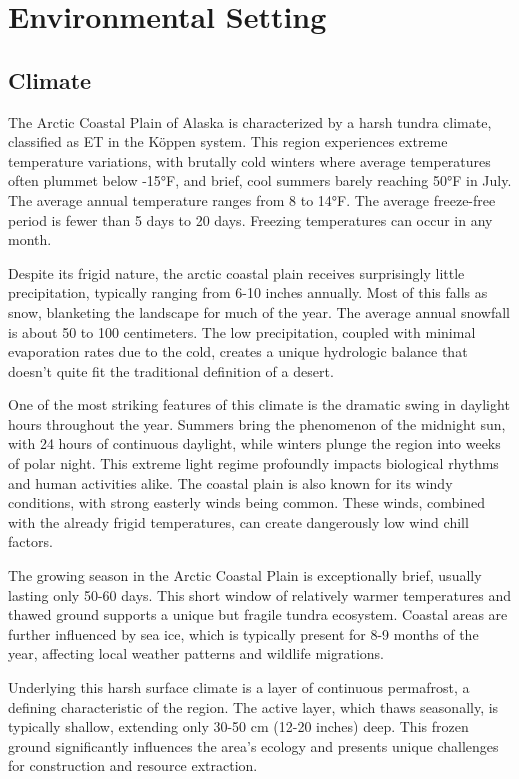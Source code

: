 \documentclass[
]{book}
\theoremstyle{definition}
\theoremstyle{definition}
\theoremstyle{definition}
\theoremstyle{definition}
\theoremstyle{remark}
\begin{document}
\hypertarget{environmental-setting}{%
\chapter{Environmental Setting}\label{environmental-setting}}

\hypertarget{climate}{%
\section{Climate}\label{climate}}

The Arctic Coastal Plain of Alaska is characterized by a harsh tundra climate, classified as ET in the Köppen system. This region experiences extreme temperature variations, with brutally cold winters where average temperatures often plummet below -15°F, and brief, cool summers barely reaching 50°F in July. The average annual temperature ranges from 8 to 14°F. The average freeze-free period is fewer than 5 days to 20 days. Freezing temperatures can occur in any month.

Despite its frigid nature, the arctic coastal plain receives surprisingly little precipitation, typically ranging from 6-10 inches annually. Most of this falls as snow, blanketing the landscape for much of the year. The average annual snowfall is about 50 to 100 centimeters. The low precipitation, coupled with minimal evaporation rates due to the cold, creates a unique hydrologic balance that doesn't quite fit the traditional definition of a desert.

One of the most striking features of this climate is the dramatic swing in daylight hours throughout the year. Summers bring the phenomenon of the midnight sun, with 24 hours of continuous daylight, while winters plunge the region into weeks of polar night. This extreme light regime profoundly impacts biological rhythms and human activities alike. The coastal plain is also known for its windy conditions, with strong easterly winds being common. These winds, combined with the already frigid temperatures, can create dangerously low wind chill factors.

The growing season in the Arctic Coastal Plain is exceptionally brief, usually lasting only 50-60 days. This short window of relatively warmer temperatures and thawed ground supports a unique but fragile tundra ecosystem. Coastal areas are further influenced by sea ice, which is typically present for 8-9 months of the year, affecting local weather patterns and wildlife migrations.

Underlying this harsh surface climate is a layer of continuous permafrost, a defining characteristic of the region. The active layer, which thaws seasonally, is typically shallow, extending only 30-50 cm (12-20 inches) deep. This frozen ground significantly influences the area's ecology and presents unique challenges for construction and resource extraction.
\end{document}
